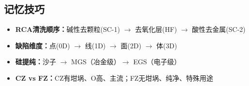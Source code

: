 \documentclass[UTF8,12pt,a4paper]{ctexart}
\begin{document}
\subsection{记忆技巧}

\begin{itemize}
    \item \textbf{RCA清洗顺序：}碱性去颗粒(SC-1) $\rightarrow$ 去氧化层(HF) $\rightarrow$ 酸性去金属(SC-2)
    \item \textbf{缺陷维度：}点(0D) $\rightarrow$ 线(1D) $\rightarrow$ 面(2D) $\rightarrow$ 体(3D)
    \item \textbf{硅提纯：}沙子 $\rightarrow$ MGS（冶金级）$\rightarrow$ EGS（电子级）
    \item \textbf{CZ vs FZ：}CZ有坩埚、O高、主流；FZ无坩埚、纯净、特殊用途
\end{itemize}
\end{document}
